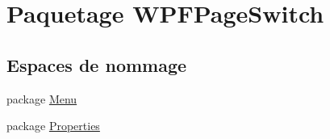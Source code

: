 \hypertarget{namespace_w_p_f_page_switch}{\section{Paquetage W\+P\+F\+Page\+Switch}
\label{namespace_w_p_f_page_switch}
}
\subsection*{Espaces de nommage}
\begin{DoxyCompactItemize}
\item 
package \hyperlink{namespace_w_p_f_page_switch_1_1_menu}{Menu}
\item 
package \hyperlink{namespace_w_p_f_page_switch_1_1_properties}{Properties}
\end{DoxyCompactItemize}
